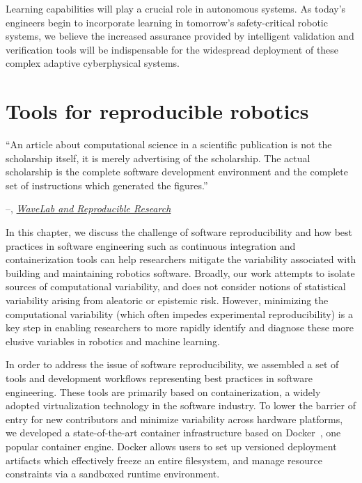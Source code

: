 \documentclass[12pt,initial,twoside,maitrise]{dms}
\numberwithin{equation}{section}
\numberwithin{table}{chapter}
\numberwithin{figure}{chapter}
\begin{document}
Learning capabilities will play a crucial role in autonomous systems. As today's engineers begin to incorporate learning in tomorrow's safety-critical robotic systems, we believe the increased assurance provided by intelligent validation and verification tools will be indispensable for the widespread deployment of these complex adaptive cyberphysical systems.

\chapter{Tools for reproducible robotics}\label{ch:ducker}

\setlength{\epigraphwidth}{0.70\textwidth}
\epigraph{``An article about computational science in a scientific publication is not the scholarship itself, it is merely advertising of the scholarship. The actual scholarship is the complete software development environment and the complete set of instructions which generated the figures.''}{\begin{flushright}--\citet{buckheit1995wavelab}, \href{https://statweb.stanford.edu/~wavelab/Wavelab_850/wavelab.pdf}{\textit{WaveLab and Reproducible Research}}\end{flushright}}

In this chapter, we discuss the challenge of software reproducibility and how best practices in software engineering such as continuous integration and containerization tools can help researchers mitigate the variability associated with building and maintaining robotics software. Broadly, our work attempts to isolate sources of computational variability, and does not consider notions of statistical variability arising from aleatoric or epistemic risk. However, minimizing the computational variability (which often impedes experimental reproducibility) is a key step in enabling researchers to more rapidly identify and diagnose these more elusive variables in robotics and machine learning.

In order to address the issue of software reproducibility, we assembled a set of tools and development workflows representing best practices in software engineering. These tools are primarily based on containerization, a widely adopted virtualization technology in the software industry. To lower the barrier of entry for new contributors and minimize variability across hardware platforms, we developed a state-of-the-art container infrastructure based on Docker~\citep{merkel2014docker}, one popular container engine. Docker allows users to set up versioned deployment artifacts which effectively freeze an entire filesystem, and manage resource constraints via a sandboxed runtime environment.
\end{document}
